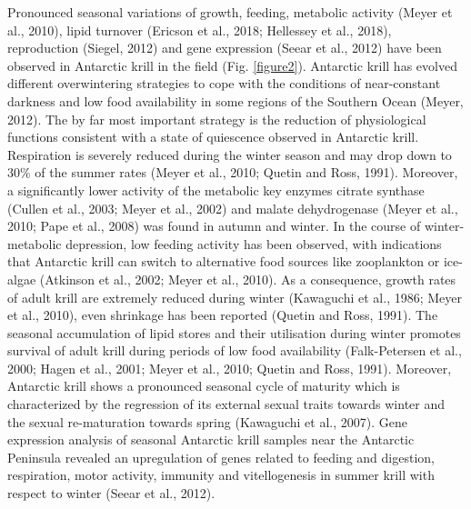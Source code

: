 Pronounced seasonal variations of growth, feeding, metabolic activity (Meyer et
al., 2010), lipid turnover (Ericson et al., 2018; Hellessey et al., 2018),
reproduction (Siegel, 2012) and gene expression (Seear et al., 2012) have been
observed in Antarctic krill in the field (Fig. \ref{figure2}). Antarctic krill has evolved
different overwintering strategies to cope with the conditions of near-constant
darkness and low food availability in some regions of the Southern Ocean
(Meyer, 2012). The by far most important strategy is the reduction of
physiological functions consistent with a state of quiescence observed in
Antarctic krill. Respiration is severely reduced during the winter season and
may drop down to 30\% of the summer rates (Meyer et al., 2010; Quetin and Ross,
1991). Moreover, a significantly lower activity of the metabolic key enzymes
citrate synthase (Cullen et al., 2003; Meyer et al., 2002) and malate
dehydrogenase (Meyer et al., 2010; Pape et al., 2008) was found in autumn and
winter. In the course of winter-metabolic depression, low feeding activity has
been observed, with indications that Antarctic krill can switch to alternative
food sources like zooplankton or ice-algae (Atkinson et al., 2002; Meyer et
al., 2010). As a consequence, growth rates of adult krill are extremely reduced
during winter (Kawaguchi et al., 1986; Meyer et al., 2010), even shrinkage has
been reported (Quetin and Ross, 1991). The seasonal accumulation of lipid
stores and their utilisation during winter promotes survival of adult krill
during periods of low food availability (Falk-Petersen et al., 2000; Hagen et
al., 2001; Meyer et al., 2010; Quetin and Ross, 1991). Moreover, Antarctic
krill shows a pronounced seasonal cycle of maturity which is characterized by
the regression of its external sexual traits towards winter and the sexual
re-maturation towards spring (Kawaguchi et al., 2007). Gene expression analysis
of seasonal Antarctic krill samples near the Antarctic Peninsula revealed an
upregulation of genes related to feeding and digestion, respiration, motor
activity, immunity and vitellogenesis in summer krill with respect to winter
(Seear et al., 2012).

